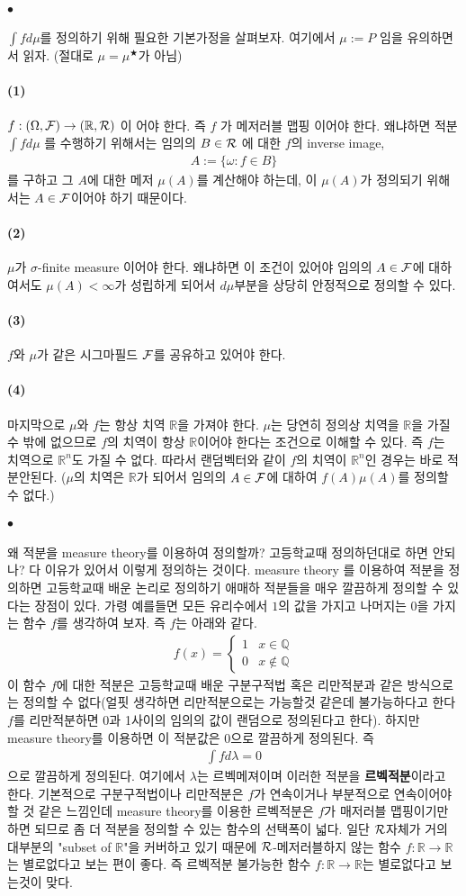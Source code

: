 \documentclass[12pt,oneside,english,a4paper]{article}
\def\ck{\paragraph{\Large$\bullet$}\Large}
\def\one{\paragraph{\Large(1)}\Large}
\def\two{\paragraph{\Large(2)}\Large}
\def\three{\paragraph{\Large(3)}\Large}
\def\four{\paragraph{\Large(4)}\Large}
\begin{document}
\ck  $\int f d \mu$를 정의하기 위해 필요한 기본가정을 살펴보자. 여기에서 $\mu:=P$ 임을 유의하면서 읽자. (절대로 $\mu=\mu^{\bigstar}$가 아님)

\one $f:(\Omega,{\cal F}) \rightarrow (\mathbb{R},{\cal R})$ 이 어야 한다. 즉 $f$ 가 메저러블 맵핑 이어야 한다. 왜냐하면 적분 $\int f d \mu$ 를 수행하기 위해서는 임의의 $B \in {\cal R}$ 에 대한 $f$의 inverse image, 
\begin{align*}
A:=\{\omega: f \in B \}
\end{align*}
를 구하고 그 $A$에 대한 메저 $\mu(A)$를 계산해야 하는데, 이 $\mu(A)$가 정의되기 위해서는 $A \in {\cal F}$이어야 하기 때문이다. 

\two $\mu$가 $\sigma$-finite measure 이어야 한다. 왜냐하면 이 조건이 있어야 임의의 $A \in {\cal F}$에 대하여서도 $\mu(A)<\infty$가 성립하게 되어서 $d \mu$부분을 상당히 안정적으로 정의할 수 있다. 

\three $f$와 $\mu$가 같은 시그마필드 $\cal F$를 공유하고 있어야 한다. 

\four 마지막으로 $\mu$와 $f$는 항상 치역 $\mathbb{R}$을 가져야 한다. $\mu$는 당연히 정의상 치역을 $\mathbb{R}$을 가질수 밖에 없으므로 $f$의 치역이 항상 $\mathbb{R}$이어야 한다는 조건으로 이해할 수 있다. 즉 $f$는 치역으로 $\mathbb{R}^n$도 가질 수 없다. 따라서 랜덤벡터와 같이 $f$의 치역이 $\mathbb{R}^n$인 경우는 바로 적분안된다. ($\mu$의 치역은 $\mathbb{R}$가 되어서 임의의 $A \in {\cal F}$에 대하여 $f(A)\mu(A)$를 정의할 수 없다.) 

\ck 왜 적분을 measure theory를 이용하여 정의할까? 고등학교때 정의하던대로 하면 안되나? 다 이유가 있어서 이렇게 정의하는 것이다. measure theory 를 이용하여 적분을 정의하면 고등학교때 배운 논리로 정의하기 애매하 적분들을 매우 깔끔하게 정의할 수 있다는 장점이 있다. 가령 예를들면 모든 유리수에서 $1$의 값을 가지고 나머지는 $0$을 가지는 함수 $f$를 생각하여 보자. 즉 $f$는 아래와 같다. 
\begin{align*}
f(x)=\begin{cases} 1 & x \in \mathbb{Q} \\ 0 & x \notin \mathbb{Q} \end{cases}
\end{align*}
이 함수 $f$에 대한 적분은 고등학교때 배운 구분구적법 혹은 리만적분과 같은 방식으로는 정의할 수 없다(얼핏 생각하면 리만적분으로는 가능할것 같은데 불가능하다고 한다 $f$를 리만적분하면 0과 1사이의 임의의 값이 랜덤으로 정의된다고 한다). 하지만 measure theory를 이용하면 이 적분값은 0으로 깔끔하게 정의된다. 즉 
\begin{align*}
\int f d\lambda=0
\end{align*}
으로 깔끔하게 정의된다. 여기에서 $\lambda$는 르벡메져이며 이러한 적분을 \textbf{르벡적분}이라고 한다. 기본적으로 구분구적법이나 리만적분은 $f$가 연속이거나 부분적으로 연속이어야 할 것 같은 느낌인데 measure theory를 이용한 르벡적분은 $f$가 매저러블 맵핑이기만 하면 되므로 좀 더 적분을 정의할 수 있는 함수의 선택폭이 넓다. 일단 ${\cal R}$자체가 거의 대부분의 "subset of $\mathbb{R}$"을 커버하고 있기 때문에 ${\cal R}$-메저러블하지 않는 함수 $f:\mathbb{R} \rightarrow \mathbb{R}$는 별로없다고 보는 편이 좋다. 즉 르벡적분 불가능한 함수 $f:\mathbb{R} \rightarrow \mathbb{R}$는 별로없다고 보는것이 맞다.
\end{document}
